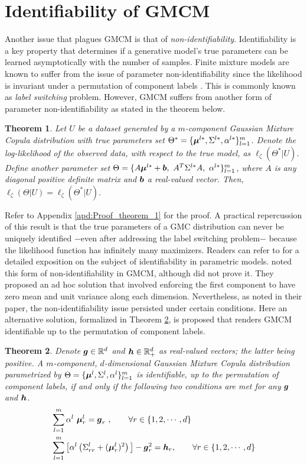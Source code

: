 \documentclass{article}
\theoremstyle{plain}
\newtheorem{theorem}{Theorem}[section]
\theoremstyle{definition}
\theoremstyle{remark}
\begin{document}
\section{Identifiability of GMCM}\label{sec:identifiability_GMCM}
Another issue that plagues GMCM is that of \emph{non-identifiability}. Identifiability is a key property that determines if a generative model's true parameters can be learned asymptotically with the number of samples. Finite mixture models are known to suffer from the issue of parameter non-identifiability since the likelihood is invariant under a permutation of component labels \citep{Stephens2000}. This is commonly known as \emph{label switching} problem. However, GMCM suffers from another form of parameter non-identifiability as stated in the theorem below.
\begin{theorem}
\label{thm:theorem1}
 Let $U$ be a dataset generated by a $m$-component Gaussian Mixture Copula distribution with true parameters set $\Theta^* = \{\boldsymbol{\mu}^{l*}, \Sigma^{l*}, \alpha^{l*}\}_{l=1}^m$. Denote the log-likelihood of the observed data, with respect to the true model, as $\ell_\zeta(\Theta^*|U)$. Define another parameter set $\Theta= \{A\bs{\mu}^{l*}+\bs{b}, \ A^T\Sigma^{l*}A, \ \alpha^{l*}\}_{l=1}^m$, where $A$ is any diagonal positive definite matrix and $\boldsymbol{b}$ a real-valued vector. Then, $\ell_\zeta(\Theta|U) = \ell_\zeta(\Theta^*|U)$.
\end{theorem}
Refer to Appendix \ref{apd:Proof_theorem_1} for the proof. A practical repercussion of this result is that the true parameters of a GMC distribution can never be uniquely identified $-$even after addressing the label switching problem$-$ because the likelihood function has infinitely many maximizers. Readers can refer to \citet{White1982} for a detailed exposition on the subject of identifiability in parametric models. \citet{Bilgrau2016} noted this form of non-identifiability in GMCM, although did not prove it. They proposed an ad hoc solution that involved enforcing the first component to have zero mean and unit variance along each dimension. Nevertheless, as noted in their paper, the non-identifiability issue persisted under certain conditions. Here an alternative solution, formalized in Theorem \ref{thm:theorem2}, is proposed that renders GMCM identifiable up to the permutation of component labels.
\begin{theorem}
\label{thm:theorem2} 
Denote $\boldsymbol{g}\in \mathbb{R}^d$ and $\boldsymbol{h}\in \mathbb{R}_+^d$ as real-valued vectors; the latter being positive. A $m$-component, $d$-dimensional Gaussian Mixture Copula distribution parametrized by $\Theta = \{\boldsymbol{\mu}^l, \Sigma^l, \alpha^l\}_{l=1}^m$ is identifiable, up to the permutation of component labels, if and only if the following two conditions are met for any $\boldsymbol{g}$ and $\boldsymbol{h}$.
\begin{align}
&\sum_{l=1}^m \alpha^l \ \boldsymbol{\mu}_r^l=\boldsymbol{g}_r \ ,\qquad \forall r \in \{1,2,\cdots,d\} \label{eq:identifiability_constraint_1} \\
&\sum_{l=1}^m \big[ \alpha^l \left(\Sigma_{rr}^l+(\boldsymbol{\mu}_r^l)^2\right)\big] -\boldsymbol{g}_r^2 =\boldsymbol{h}_r ,\qquad \forall r \in \{1,2,\cdots,d\}\label{eq:identifiability_constraint_2}
\end{align}
\end{theorem}
\end{document}
